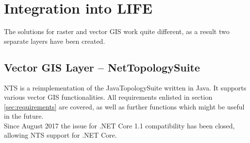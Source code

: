 \section{Integration into LIFE}
The solutions for raster and vector GIS work quite different, as a result two separate layers have been created.


\subsection{Vector GIS Layer -- NetTopologySuite}
NTS is a reimplementation of the JavaTopologySuite written in Java. It supports various vector GIS functionalities. All requirements enlisted in section \ref{sec:requirements} are covered, as well as further functions which might be useful in the future.\\
Since August 2017 the issue for .NET Core 1.1 compatibility has been closed, allowing NTS support for .NET Core.


